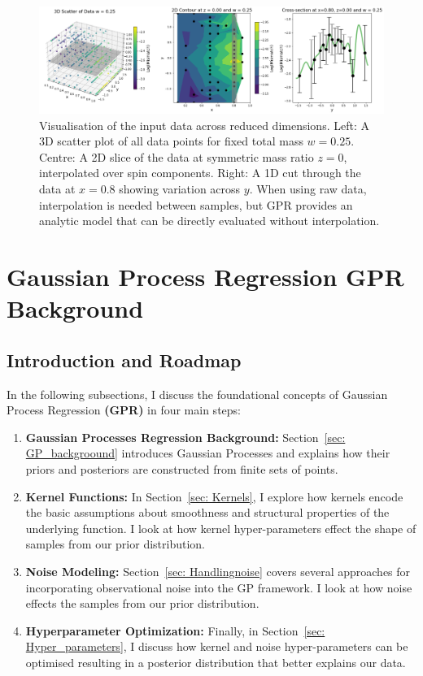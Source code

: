 \documentclass[12pt]{article}
\begin{document}
\begin{figure}[H]
    \centering
    \includegraphics[width=1\textwidth]{LatexPlots/final_gps_plots/data_visual.png}
    \caption{
    Visualisation of the input data across reduced dimensions. 
    Left: A 3D scatter plot of all data points for fixed total mass \(w = 0.25\). 
    Centre: A 2D slice of the data at symmetric mass ratio \(z = 0\), interpolated over spin components.
    Right: A 1D cut through the data at \(x = 0.8\) showing variation across \(y\). 
    When using raw data, interpolation is needed between samples, but GPR provides an analytic model that can be directly evaluated without interpolation.
    }
    \label{fig:visualising_data}
\end{figure}








\section{Gaussian Process Regression \textbf{GPR} Background}
\subsection{Introduction and Roadmap}

In the following subsections, I discuss the foundational concepts of Gaussian Process Regression \textbf{(GPR)} in four main steps:
\begin{enumerate}
    \item \textbf{Gaussian Processes Regression Background:} Section~\ref{sec: GP_backgroound} introduces Gaussian Processes and explains how their priors and posteriors are constructed from finite sets of points.
    \item \textbf{Kernel Functions:} In Section~\ref{sec: Kernels}, I explore how kernels encode the basic assumptions about smoothness and structural properties of the underlying function. I look at how kernel hyper-parameters effect the shape of samples from our prior distribution.
    \item \textbf{Noise Modeling:} Section~\ref{sec: Handlingnoise} covers several approaches for incorporating observational noise into the GP framework. I look at how noise effects the samples from our prior distribution.
    \item \textbf{Hyperparameter Optimization:} Finally, in Section~\ref{sec: Hyper_parameters}, I discuss how kernel and noise hyper-parameters can be optimised resulting in a posterior distribution that better explains our data.
\end{enumerate}
\end{document}
